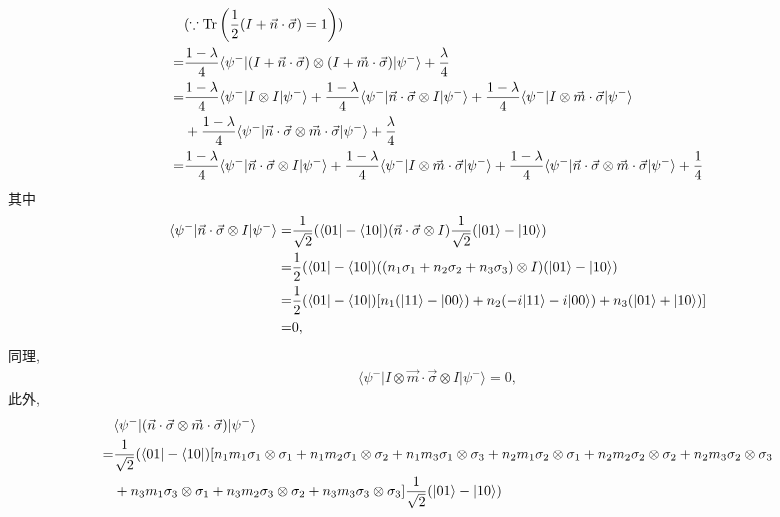 \documentclass{assignment}
\begin{document}
\begin{sol}
\begin{itemize}
\begin{align}
            \notag&(\because\operatorname{Tr}\left(\frac{1}{2}(I+\vec{n}\cdot\vec{\sigma})=1\right))\\
            \notag=&\frac{1-\lambda}{4}\langle\psi^-\rvert(I+\vec{n}\cdot\vec{\sigma})\otimes(I+\vec{m}\cdot\vec{\sigma})\lvert\psi^-\rangle+\frac{\lambda}{4}\\
            \notag=&\frac{1-\lambda}{4}\langle\psi^-\rvert I\otimes I\lvert\psi^-\rangle+\frac{1-\lambda}{4}\langle\psi^-\rvert\vec{n}\cdot\vec{\sigma}\otimes I\lvert\psi^-\rangle+\frac{1-\lambda}{4}\langle\psi^-\rvert I\otimes\vec{m}\cdot\vec{\sigma}\lvert\psi^-\rangle\\
            \notag&+\frac{1-\lambda}{4}\langle\psi^-\rvert\vec{n}\cdot\vec{\sigma}\otimes\vec{m}\cdot\vec{\sigma}\lvert\psi^-\rangle+\frac{\lambda}{4}\\
            =&\frac{1-\lambda}{4}\langle\psi^-\rvert\vec{n}\cdot\vec{\sigma}\otimes I\lvert\psi^-\rangle+\frac{1-\lambda}{4}\langle\psi^-\rvert I\otimes\vec{m}\cdot\vec{\sigma}\lvert\psi^-\rangle+\frac{1-\lambda}{4}\langle\psi^-\rvert\vec{n}\cdot\vec{\sigma}\otimes\vec{m}\cdot\vec{\sigma}\lvert\psi^-\rangle+\frac{1}{4}
        \end{align}
        其中
        \begin{align}
            \notag\langle\psi^-\rvert\vec{n}\cdot\vec{\sigma}\otimes I\lvert\psi^-\rangle=&\frac{1}{\sqrt{2}}(\langle 01\rvert-\langle 10\rvert)(\vec{n}\cdot\vec{\sigma}\otimes I)\frac{1}{\sqrt{2}}(\lvert 01\rangle-\lvert 10\rangle)\\
            \notag=&\frac{1}{2}(\langle 01\rvert-\langle 10\rvert)((n_1\sigma_1+n_2\sigma_2+n_3\sigma_3)\otimes I)(\lvert 01\rangle-\lvert 10\rangle)\\
            \notag=&\frac{1}{2}(\langle 01\rvert-\langle 10\rvert)[n_1(\lvert 11\rangle-\lvert 00\rangle)+n_2(-i\lvert 11\rangle-i\lvert 00\rangle)+n_3(\lvert 01\rangle+\lvert 10\rangle)]\\
            =&0,
        \end{align}
        同理,
        \begin{align}
            \langle\psi^-\rvert I\otimes\vec{m}\cdot\vec{\sigma}\otimes I\lvert\psi^-\rangle=0,
        \end{align}
        此外,
        \begin{align}
            \notag&\langle\psi^-\rvert(\vec{n}\cdot\vec{\sigma}\otimes\vec{m}\cdot\vec{\sigma})\lvert\psi^-\rangle\\
            \notag=&\frac{1}{\sqrt{2}}(\langle 01\rvert-\langle 10\rvert)[n_1m_1\sigma_1\otimes\sigma_1+n_1m_2\sigma_1\otimes\sigma_2+n_1m_3\sigma_1\otimes\sigma_3+n_2m_1\sigma_2\otimes\sigma_1+n_2m_2\sigma_2\otimes\sigma_2+n_2m_3\sigma_2\otimes\sigma_3\\\notag&+n_3m_1\sigma_3\otimes\sigma_1+n_3m_2\sigma_3\otimes\sigma_2+n_3m_3\sigma_3\otimes\sigma_3]\frac{1}{\sqrt{2}}(\lvert 01\rangle-\lvert 10\rangle)\\

\end{align}
\end{itemize}
\end{sol}
\end{document}
